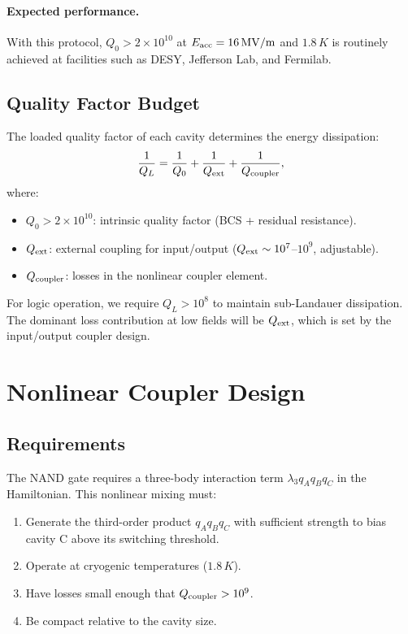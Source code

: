 \documentclass[12pt,a4paper]{article}
\begin{document}
\paragraph{Expected performance.} With this protocol, $Q_0 > 2 \times 10^{10}$ at $E_{\rm acc} = 16\,\si{MV/m}$ and $1.8\,\si{K}$ is routinely achieved at facilities such as DESY, Jefferson Lab, and Fermilab.

\subsection{Quality Factor Budget}

The loaded quality factor of each cavity determines the energy dissipation:
\begin{equation}
\frac{1}{Q_L} = \frac{1}{Q_0} + \frac{1}{Q_{\rm ext}} + \frac{1}{Q_{\rm coupler}},
\end{equation}
where:
\begin{itemize}
\item $Q_0 > 2 \times 10^{10}$: intrinsic quality factor (BCS + residual resistance).
\item $Q_{\rm ext}$: external coupling for input/output ($Q_{\rm ext} \sim 10^7$--$10^9$, adjustable).
\item $Q_{\rm coupler}$: losses in the nonlinear coupler element.
\end{itemize}

For logic operation, we require $Q_L > 10^8$ to maintain sub-Landauer dissipation. The dominant loss contribution at low fields will be $Q_{\rm ext}$, which is set by the input/output coupler design.

\section{Nonlinear Coupler Design}

\subsection{Requirements}

The NAND gate requires a three-body interaction term $\lambda_3 q_A q_B q_C$ in the Hamiltonian. This nonlinear mixing must:
\begin{enumerate}
\item Generate the third-order product $q_A q_B q_C$ with sufficient strength to bias cavity C above its switching threshold.
\item Operate at cryogenic temperatures ($1.8\,\si{K}$).
\item Have losses small enough that $Q_{\rm coupler} > 10^9$.
\item Be compact relative to the cavity size.
\end{enumerate}
\end{document}
